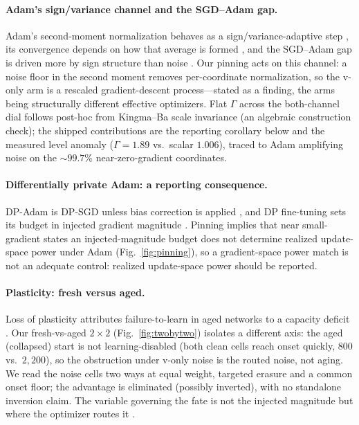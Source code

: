 \paragraph{Adam's sign/variance channel and the SGD--Adam gap.}
Adam's second-moment normalization behaves as a sign/variance-adaptive step
\citep{adam,balleshennig}, its convergence depends on how that average is formed
\citep{amsgrad}, and the SGD--Adam gap is driven more by sign structure than noise
\citep{kunstner}. Our pinning acts on this channel: a noise floor in the second
moment removes per-coordinate normalization, so the v-only arm is a rescaled
gradient-descent process---stated as a finding, the arms being structurally
different effective optimizers. Flat $\Gamma$ across the both-channel dial follows
post-hoc from Kingma--Ba scale invariance (an algebraic construction check); the
shipped contributions are the reporting corollary below and the measured level
anomaly ($\Gamma=1.89$ vs.\ scalar $1.006$), traced to Adam amplifying noise on the
${\sim}99.7\%$ near-zero-gradient coordinates.

\paragraph{Differentially private Adam: a reporting consequence.}
DP-Adam is DP-SGD unless bias correction is applied \citep{dpadambc}, and DP
fine-tuning sets its budget in injected gradient magnitude \citep{litramer}.
Pinning implies that near small-gradient states an injected-magnitude budget does
not determine realized update-space power under Adam (Fig.~\ref{fig:pinning}), so
a gradient-space power match is not an adequate control: realized update-space
power should be reported.

\paragraph{Plasticity: fresh versus aged.}
Loss of plasticity attributes failure-to-learn in aged networks to a capacity
deficit \citep{dohare}. Our fresh-vs-aged $2\times2$ (Fig.~\ref{fig:twobytwo})
isolates a different axis: the aged (collapsed) start is not learning-disabled
(both clean cells reach onset quickly, $800$ vs.\ $2{,}200$), so the obstruction
under v-only noise is the routed noise, not aging. We read the noise cells two
ways at equal weight, targeted erasure and a common onset floor; the advantage is
eliminated (possibly inverted), with no standalone inversion claim. The variable
governing the fate is not the injected magnitude but where the optimizer routes it
\citep{position}.

